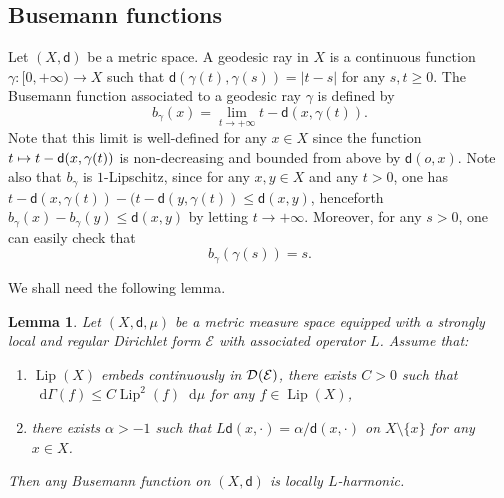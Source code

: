 \documentclass[10pt]{amsart}
\newcommand\mto{\mathchoice{\longmapsto}{\mapsto}{\mapsto}{\mapsto}}
\let\backslash\setminus
\newcommand{\NoChangel}[1]{%
\expandafter\let\csname old\string#1\endcsname=#1
\let#1=\relax
\newcommand{#1}{\mathcode`l="716C\csname old\string#1\endcsname\mathcode`l="7160 }%
}
\theoremstyle{plain}
\newtheorem{lemma}[theorem]{Lemma}
\theoremstyle{definition}
\newcommand{\cE}{\mathcal{E}}
\newcommand{\cD}{\mathcal{D}}
\newcommand{\di}{\mathop{}\!\mathrm{d}}
\newcommand{\loc}{\mathrm{loc}}\NoChangel{\loc}
\DeclareMathOperator{\Lip}{Lip}
\newcommand{\dist}{\mathsf{d}}
\begin{document}
\subsection*{Busemann functions}

Let $(X,\dist)$ be a metric space. A geodesic ray in $X$ is a continuous function $\gamma:[0,+\infty)\to X$ such that $\dist(\gamma(t),\gamma(s))=|t-s|$ for any $s,t\ge 0$. The Busemann function associated to a geodesic ray $\gamma$ is defined by
\[
b_\gamma(x)=\lim_{t \to +\infty} t - \dist(x,\gamma(t)).
\]
Note that this limit is well-defined for any $x \in X$ since the function $t \mto t - \dist(x,\gamma(t))$ is non-decreasing and bounded from above by $\dist(o,x)$. Note also that $b_\gamma$ is $1$-Lipschitz, since for any $x, y \in X$ and any $t>0$, one has $t - \dist(x,\gamma(t)) - (t - \dist(y,\gamma(t)) \le \dist(x,y)$, henceforth $b_\gamma(x) - b_\gamma(y) \le \dist(x,y)$ by letting $t \to +\infty$. Moreover, for any $s>0$, one can easily check that
\begin{equation}%
b_\gamma(\gamma(s))=s.
\end{equation}

We shall need the following lemma.

\begin{lemma}\label{lem:preparatory}
Let $(X,\dist,\mu)$ be a metric measure space equipped with a strongly local and regular Dirichlet form $\cE$ with associated operator $L$. Assume that:
\begin{enumerate}
\item\label{lem:preparatory1} $\Lip(X)$ embeds continuously in $\cD_{\loc}(\cE)$, \ie there exists $C>0$ such that $\di\Gamma(f)\le C \Lip^2(f)\di \mu$ for any $f \in \Lip(X)$,
\item\label{lem:preparatory2} there exists $\alpha>-1$ such that $L\dist(x,\cdot)=\alpha/\dist(x,\cdot)$ on $X\backslash \{x\}$ for any $x \in X$.
\end{enumerate}
Then any Busemann function on $(X,\dist)$ is locally $L$-harmonic.
\end{lemma}
\end{document}
